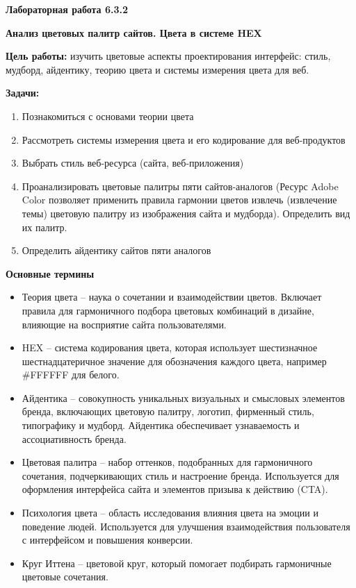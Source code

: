 
\graphicspath{ {6.3.2/models/} }

\pagestyle{fancy}
\fancyhead{}
\renewcommand{\headrulewidth}{0pt}


\begin{center}
    \textbf{Лабораторная работа 6.3.2}

    \textbf{Анализ цветовых палитр сайтов. Цвета в системе HEX}
\end{center}

\textbf{Цель работы:} изучить цветовые аспекты проектирования интерфейс: стиль, мудборд, айдентику, теорию цвета и системы измерения цвета для веб.
\bigskip

\textbf{Задачи:}

\begin{enumerate}
    \item Познакомиться с основами теории цвета
    \item Рассмотреть системы измерения цвета и его кодирование для веб-продуктов
    \item Выбрать стиль веб-ресурса (сайта, веб-приложения)
    \item Проанализировать цветовые палитры пяти сайтов-аналогов (Ресурс Adobe Color позволяет применить правила гармонии цветов извлечь (извлечение темы) цветовую палитру из изображения сайта и мудборда). Определить вид их палитр.
    \item Определить айдентику сайтов пяти аналогов
\end{enumerate}
\bigskip

\textbf{Основные термины}

\begin{itemize}
    \item Теория цвета – наука о сочетании и взаимодействии цветов. Включает правила для гармоничного подбора цветовых комбинаций в дизайне, влияющие на восприятие сайта пользователями.
    \item HEX – система кодирования цвета, которая использует шестизначное шестнадцатеричное значение для обозначения каждого цвета, например \#FFFFFF для белого.
    \item Айдентика – совокупность уникальных визуальных и смысловых элементов бренда, включающих цветовую палитру, логотип, фирменный стиль, типографику и мудборд. Айдентика обеспечивает узнаваемость и ассоциативность бренда.
    \item Цветовая палитра – набор оттенков, подобранных для гармоничного сочетания, подчеркивающих стиль и настроение бренда. Используется для оформления интерфейса сайта и элементов призыва к действию (CTA).
    \item Психология цвета – область исследования влияния цвета на эмоции и поведение людей. Используется для улучшения взаимодействия пользователя с интерфейсом и повышения конверсии.
    \item Круг Иттена – цветовой круг, который помогает подбирать гармоничные цветовые сочетания.
\end{itemize}
\bigskip

